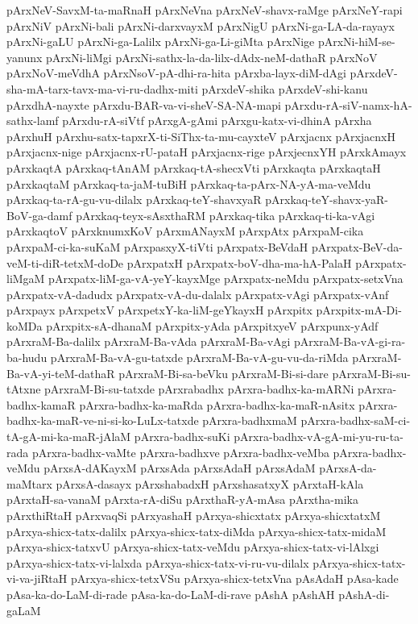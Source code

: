 {pArxNeV-SavxM-ta-maRnaH
pArxNeVna
pArxNeV-shavx-raMge
pArxNeY-rapi
pArxNiV
pArxNi-bali
pArxNi-darxvayxM
pArxNigU
pArxNi-ga-LA-da-rayayx
pArxNi-gaLU
pArxNi-ga-Lalilx
pArxNi-ga-Li-giMta
pArxNige
pArxNi-hiM-se-yanunx
pArxNi-liMgi
pArxNi-sathx-la-da-lilx-dAdx-neM-dathaR
pArxNoV
pArxNoV-meVdhA
pArxNsoV-pA-dhi-ra-hita
pArxba-layx-diM-dAgi
pArxdeV-sha-mA-tarx-tavx-ma-vi-ru-dadhx-miti
pArxdeV-shika
pArxdeV-shi-kanu
pArxdhA-nayxte
pArxdu-BAR-va-vi-sheV-SA-NA-mapi
pArxdu-rA-siV-namx-hA-sathx-lamf
pArxdu-rA-siVtf
pArxgA-gAmi
pArxgu-katx-vi-dhinA
pArxha
pArxhuH
pArxhu-satx-tapxrX-ti-SiThx-ta-mu-cayxteV
pArxjacnx
pArxjacnxH
pArxjacnx-nige
pArxjacnx-rU-pataH
pArxjacnx-rige
pArxjecnxYH
pArxkAmayx
pArxkaqtA
pArxkaq-tAnAM
pArxkaq-tA-shecxVti
pArxkaqta
pArxkaqtaH
pArxkaqtaM
pArxkaq-ta-jaM-tuBiH
pArxkaq-ta-pArx-NA-yA-ma-veMdu
pArxkaq-ta-rA-gu-vu-dilalx
pArxkaq-teY-shavxyaR
pArxkaq-teY-shavx-yaR-BoV-ga-damf
pArxkaq-teyx-sAsxthaRM
pArxkaq-tika
pArxkaq-ti-ka-vAgi
pArxkaqtoV
pArxknumxKoV
pArxmANayxM
pArxpAtx
pArxpaM-cika
pArxpaM-ci-ka-suKaM
pArxpasxyX-tiVti
pArxpatx-BeVdaH
pArxpatx-BeV-da-veM-ti-diR-tetxM-doDe
pArxpatxH
pArxpatx-boV-dha-ma-hA-PalaH
pArxpatx-liMgaM
pArxpatx-liM-ga-vA-yeY-kayxMge
pArxpatx-neMdu
pArxpatx-setxVna
pArxpatx-vA-dadudx
pArxpatx-vA-du-dalalx
pArxpatx-vAgi
pArxpatx-vAnf
pArxpayx
pArxpetxV
pArxpetxY-ka-liM-geYkayxH
pArxpitx
pArxpitx-mA-Di-koMDa
pArxpitx-sA-dhanaM
pArxpitx-yAda
pArxpitxyeV
pArxpunx-yAdf
pArxraM-Ba-dalilx
pArxraM-Ba-vAda
pArxraM-Ba-vAgi
pArxraM-Ba-vA-gi-ra-ba-hudu
pArxraM-Ba-vA-gu-tatxde
pArxraM-Ba-vA-gu-vu-da-riMda
pArxraM-Ba-vA-yi-teM-dathaR
pArxraM-Bi-sa-beVku
pArxraM-Bi-si-dare
pArxraM-Bi-su-tAtxne
pArxraM-Bi-su-tatxde
pArxrabadhx
pArxra-badhx-ka-mARNi
pArxra-badhx-kamaR
pArxra-badhx-ka-maRda
pArxra-badhx-ka-maR-nAsitx
pArxra-badhx-ka-maR-ve-ni-si-ko-LuLx-tatxde
pArxra-badhxmaM
pArxra-badhx-saM-ci-tA-gA-mi-ka-maR-jAlaM
pArxra-badhx-suKi
pArxra-badhx-vA-gA-mi-yu-ru-ta-rada
pArxra-badhx-vaMte
pArxra-badhxve
pArxra-badhx-veMba
pArxra-badhx-veMdu
pArxsA-dAKayxM
pArxsAda
pArxsAdaH
pArxsAdaM
pArxsA-da-maMtarx
pArxsA-dasayx
pArxshabadxH
pArxshasatxyX
pArxtaH-kAla
pArxtaH-sa-vanaM
pArxta-rA-diSu
pArxthaR-yA-mAsa
pArxtha-mika
pArxthiRtaH
pArxvaqSi
pArxyashaH
pArxya-shicxtatx
pArxya-shicxtatxM
pArxya-shicx-tatx-dalilx
pArxya-shicx-tatx-diMda
pArxya-shicx-tatx-midaM
pArxya-shicx-tatxvU
pArxya-shicx-tatx-veMdu
pArxya-shicx-tatx-vi-lAlxgi
pArxya-shicx-tatx-vi-lalxda
pArxya-shicx-tatx-vi-ru-vu-dilalx
pArxya-shicx-tatx-vi-va-jiRtaH
pArxya-shicx-tetxVSu
pArxya-shicx-tetxVna
pAsAdaH
pAsa-kade
pAsa-ka-do-LaM-di-rade
pAsa-ka-do-LaM-di-rave
pAshA
pAshAH
pAshA-di-gaLaM
}
